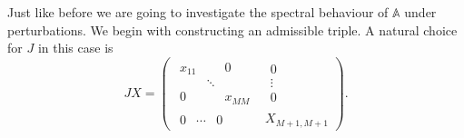 \documentclass[a4paper]{jpconf}
\begin{document}
Just like before we are going to investigate
    the spectral behaviour of \( \mathbb{A} \) under perturbations.
We begin with constructing an admissible triple.
A natural choice for \( J \) in this case is
\[
        J X =
        \left(\begin{array}{c|c}
            \begin{matrix}
                x_{11} &  & 0 \\
                 & \ddots &  \\
                0 &  & x_{MM}
            \end{matrix} &
            \begin{matrix}
                0 \\
                \vdots \\
                0
            \end{matrix} \\ \hline
            \begin{matrix}
                0 & \cdots & 0
            \end{matrix} &
            X_{M+1,M+1}
        \end{array}\right).
\]
\end{document}
